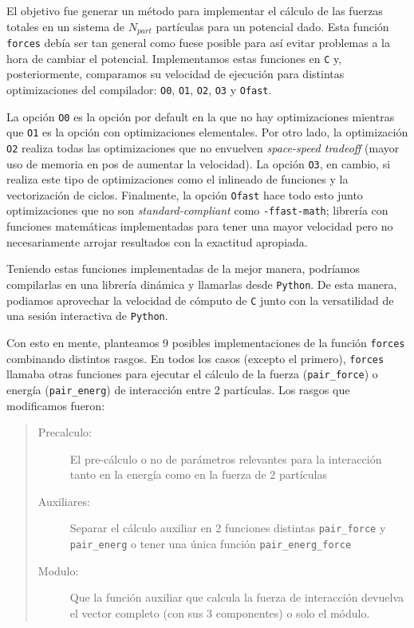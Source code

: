 El objetivo fue generar un método para implementar el cálculo de las fuerzas totales en un sistema de $N_{part}$ partículas para un potencial dado. 
Esta función \texttt{forces} debía ser tan general como fuese posible para así evitar problemas a la hora de cambiar el potencial. 
Implementamos estas funciones en \texttt{C} y, posteriormente, comparamos su velocidad de ejecución para distintas optimizaciones del compilador: \texttt{O0}, \texttt{O1}, \texttt{O2}, \texttt{O3} y \texttt{Ofast}. 

La opción \texttt{O0} es la opción por default en la que no hay optimizaciones mientras que \texttt{O1} es la opción con optimizaciones elementales. 
Por otro lado, la optimización \texttt{O2} realiza todas las optimizaciones que no envuelven \textit{space-speed tradeoff} (mayor uso de memoria en pos de aumentar la velocidad). La opción \texttt{O3}, en cambio, 
si realiza este tipo de optimizaciones como el inlineado de funciones y la vectorización de ciclos. 
Finalmente, la opción \texttt{Ofast} hace todo esto junto optimizaciones que no son \textit{standard-compliant} como \texttt{-ffast-math}; librería con funciones matemáticas implementadas para tener una mayor 
velocidad pero no necesariamente arrojar resultados con la exactitud apropiada. 

Teniendo estas funciones implementadas de la mejor manera, podríamos compilarlas en una librería dinámica y llamarlas desde \texttt{Python}.
De esta manera, podiamos aprovechar la velocidad de cómputo de \texttt{C} junto con la versatilidad de una sesión interactiva de \texttt{Python}.

Con esto en mente, planteamos 9 posibles implementaciones de la función \texttt{forces} combinando distintos rasgos. 
En todos los casos (excepto el primero), \texttt{forces} llamaba otras funciones para ejecutar el cálculo de la fuerza (\texttt{pair\_force}) o energía (\texttt{pair\_energ}) de interacción entre 2 partículas. 
Los rasgos que modificamos fueron: 

\begin{quote}
\begin{description}
\item[Precalculo:] El pre-cálculo o no de parámetros relevantes para la interacción tanto en la energía como en la fuerza de 2 partículas

\item[Auxiliares:] Separar el cálculo auxiliar en 2 funciones distintas \texttt{pair\_force} y \texttt{pair\_energ} o tener una única función \texttt{pair\_energ\_force}

\item[Modulo:] Que la función auxiliar que calcula la fuerza de interacción devuelva el vector completo (con sus 3 componentes) o solo el módulo.
\end{description}
\end{quote}

